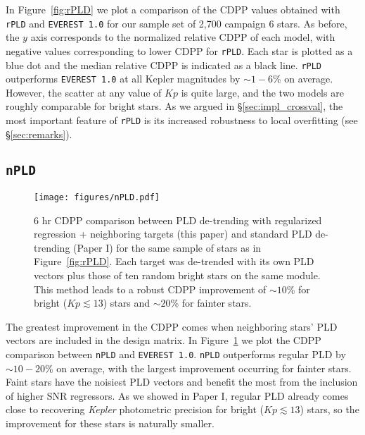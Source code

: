 \documentclass[]{emulateapj}
\newcommand{\Kp}{\ensuremath{Kp}}
\begin{document}
In Figure~\ref{fig:rPLD} we plot a comparison of the CDPP values obtained with \texttt{rPLD}
and \texttt{EVEREST 1.0} for our sample set of 2,700 campaign 6 stars. As before, the $y$
axis corresponds to the normalized relative CDPP of each model, with negative values
corresponding to lower CDPP for \texttt{rPLD}. Each star is plotted as a blue dot and the median
relative CDPP is indicated as a black line. \texttt{rPLD} outperforms \texttt{EVEREST 1.0} at all
Kepler magnitudes by ${\sim}1-6\%$ on average. However, the scatter at any value of
$\Kp$ is quite large, and the two models are roughly comparable for bright stars. As we
argued in \S\ref{sec:impl_crossval}, the most important feature of \texttt{rPLD} is 
its increased robustness to local overfitting (see \S\ref{sec:remarks}).

\subsection{\texttt{nPLD}}
\begin{figure}[hbt]
  \begin{center}
      \texttt{[image: figures/nPLD.pdf]}
       \caption{6 hr CDPP comparison between PLD de-trending with regularized regression + neighboring targets 
                (this paper) and standard PLD de-trending (Paper I) for the same sample of stars as in Figure~\ref{fig:rPLD}.
                Each target was de-trended with its own PLD vectors plus those of ten random bright stars
                on the same module. This method leads to a robust CDPP improvement of ${\sim}10$\% for bright ($\Kp \lesssim 13$) stars
                and ${\sim}20$\% for fainter stars.}
     \label{fig:nPLD}
  \end{center}
\end{figure}

The greatest improvement in the CDPP comes when neighboring stars' PLD vectors are included
in the design matrix. In Figure~\ref{fig:nPLD} we plot the CDPP comparison between \texttt{nPLD}
and \texttt{EVEREST 1.0}. \texttt{nPLD} outperforms regular PLD by ${\sim}10-20\%$
on average, with the largest improvement occurring for fainter stars. Faint stars have the
noisiest PLD vectors and benefit the most from the inclusion of higher SNR regressors.
As we showed in Paper I, regular PLD already comes close to recovering \emph{Kepler} photometric 
precision for bright ($\Kp \lesssim 13$) stars, so the improvement for these stars is naturally 
smaller.
\end{document}
